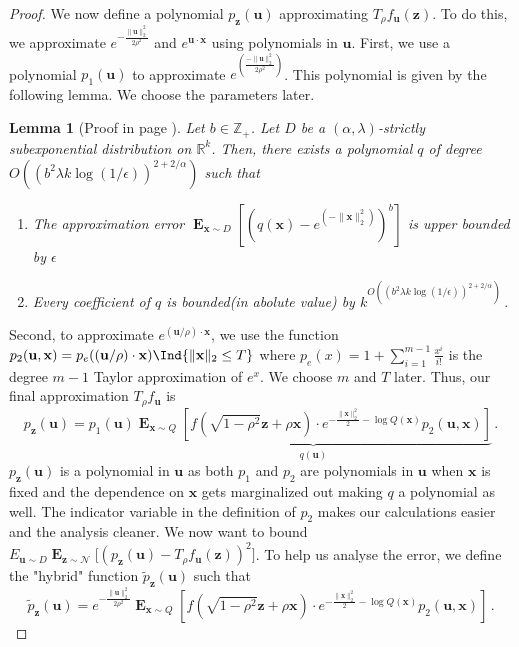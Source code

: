 \documentclass[10pt,a4paper]{article}
\newtheorem{lemma}{Lemma}[section]
\newcommand\twonorm[1]{\|#1\|_2}
\renewcommand\vec[1]{\mathbf{#1}}
\DeclareMathOperator*{\E}{\mathbf{E}}
\newcommand{\R}{\mathbb{R}}
\newcommand{\Z}{\mathbb{Z}}
\newcommand{\1}{\Ind}
\newcommand{\x}{\vec x}
\newcommand{\vu}{\vec u}
\newcommand{\z}{\vec z}
\newcommand{\Gauss}{\mathcal{N}}
\begin{document}
\begin{proof}
    We now define a polynomial $p_{\z}(\vu)$ approximating $T_{\rho}f_{\vu}(\z)$. To do this, we approximate $e^{-\frac{\twonorm{\vu}^2}{2\rho^2}}$ and $e^{\vu\cdot \x}$ using polynomials in $\vu$. 
    First, we use a polynomial $p_1(\vu)$ to approximate $e^{\left(\frac{-\twonorm{\vu}^2}{2\rho^2}\right)}$. This polynomial is given by the following lemma. We choose the parameters later.
\begin{lemma}[Proof in page \pageref{proof:exp_approx_subexp}]
    \label{thm:exp_approx_subexp}
    Let $b\in \Z_{+}$. Let $D$ be a $(\alpha,\lambda)$-strictly subexponential distribution on $\R^k$. Then, there exists a polynomial $q$ of degree $O\left( (b^2\lambda k\log(1/\epsilon))^{2+2/\alpha} \right)$ such that 
    \begin{enumerate}
        \item The approximation error $\E_{\x\sim D}\left[ \left(q(\x)-e^{\left(-\twonorm{\x}^2\right)}\right)^b\right]$ is upper bounded by  $\epsilon$
    \item Every coefficient of $q$ is bounded(in abolute value) by $k^{O\left((b^{2}\lambda k\log(1/\epsilon))^{2+2/\alpha} \right)}\,.$ 
    \end{enumerate}
\end{lemma}
 Second, to approximate $e^{(\vu/\rho)\cdot\x}$, we use the function $p_2(\vu,\x)=p_e((\vu/\rho)\cdot \x)\1\{\twonorm{\x}\leq T\}$ where $p_e(x)=1+\sum_{i=1}^{m-1}\frac{x^i}{i!}$ is the degree $m-1$ Taylor approximation of $e^x$. We choose $m$ and $T$ later. 
    Thus, our final approximation $T_{\rho}f_{\vu}$ is 
    \[
        p_{\z}(\vu)=p_1(\vu)\underbrace{\E_{\x\sim Q}\left[f(\sqrt{1-\rho^2}\z+\rho\x)\cdot e^{-\frac{\twonorm{\x}^2}{2}-\log Q(\x)}p_2(\vu,\x)\right]}_{\text{$q(\vu)$}}\,.
    \]
    $p_{\z}(\vu)$ is a polynomial in $\vu$ as both $p_1$ and $p_2$ are polynomials in $\vu$ when $\x$ is fixed and the dependence on $\x$ gets marginalized out making $q$ a polynomial as well. The indicator variable in the definition of $p_2$ makes our calculations easier and the analysis cleaner. We now want to bound $E_{\vu\sim D}\E_{\z\sim \Gauss}\bigl[(p_{\z}(\vu)-T_{\rho}f_{\vu}(\z))^2\bigr]$. To help us analyse the error, we define the "hybrid" function $\tilde{p}_{\z}(\vu)$ such that 
    \[
        \tilde{p}_{\z}(\vu)=e^{-\frac{\twonorm{\vu}^2}{2\rho^2}}\E_{\x\sim Q}\left[f(\sqrt{1-\rho^2}\z+\rho\x)\cdot e^{-\frac{\twonorm{\x}^2}{2}-\log Q(\x)}p_2(\vu,\x)\right]\,.
    \]


\end{proof}
\end{document}

